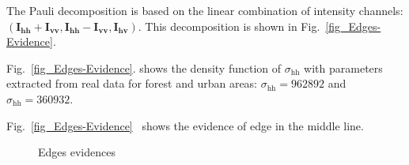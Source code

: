 \documentclass[conference]{IEEEtran}
\begin{document}
The Pauli decomposition is based on the linear combination of intensity channels: $(\mathbf{I_\text{hh}+I_{\text{vv}}}, \mathbf{I_\text{hh}-I_{\text{vv}}}, \mathbf{I_\text{hv}})$. 
This decomposition is shown in Fig.~\ref{fig_Edges-Evidence}. 

Fig.~\ref{fig_Edges-Evidence}. 
shows the density function of $\sigma_\text{hh}$ with parameters extracted from real data for forest and urban areas: $\sigma_\text{hh}=962892$ and $\sigma_\text{hh}= 360932$.  

Fig.~\ref{fig_Edges-Evidence}~ shows the evidence of edge in the middle line.
    
\begin{figure}[hbt]
	\centering
     \caption{Edges evidences}
     \label{fig_evid_bordas}
   \end{figure}	
\end{document}
